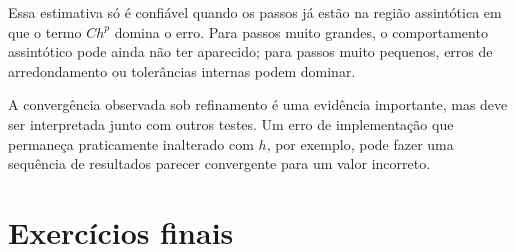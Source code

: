 Essa estimativa só é confiável quando os passos já estão na região assintótica em que o termo $Ch^p$ domina o erro. Para passos muito grandes, o comportamento assintótico pode ainda não ter aparecido; para passos muito pequenos, erros de arredondamento ou tolerâncias internas podem dominar.

\begin{obs}
A convergência observada sob refinamento é uma evidência importante, mas deve ser interpretada junto com outros testes. Um erro de implementação que permaneça praticamente inalterado com $h$, por exemplo, pode fazer uma sequência de resultados parecer convergente para um valor incorreto.
\end{obs}

\section{Exercícios finais}


